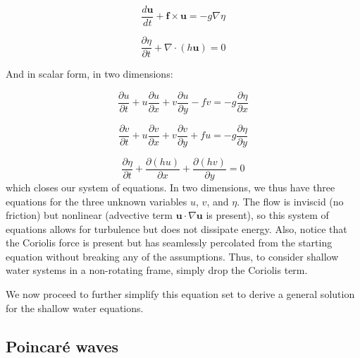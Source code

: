 \documentclass[12pt]{article}
\numberwithin{equation}{section}
\numberwithin{figure}{section}
\numberwithin{table}{section}
\begin{document}
\begin{equation}
  \frac{d \mathbf{u}}{dt} + \mathbf{f} \times \mathbf{u} =
  - g \nabla \eta
  \label{eq:shallow_water_final_momentum}
\end{equation}

\begin{equation}
  \frac{\partial \eta}{\partial t} + \nabla \cdot (h \mathbf{u}) = 0
  \label{eq:shallow_water_final_continuity}
\end{equation}

And in scalar form, in two dimensions:

\begin{equation}
  \frac{\partial u}{\partial t} +
  u \frac{\partial u}{\partial x} +
  v \frac{\partial u}{\partial y} -
  f v = 
  -g \frac{\partial \eta}{\partial x}
  \label{eq:shallow_water_final_scalar_u}
\end{equation}

\begin{equation}
  \frac{\partial v}{\partial t} +
  u \frac{\partial v}{\partial x} +
  v \frac{\partial v}{\partial y} +
  f u =
  -g \frac{\partial \eta}{\partial y}
  \label{eq:shallow_water_final_scalar_v}
\end{equation}

\begin{equation}
  \frac{\partial \eta}{\partial t} +
  \frac{\partial (hu)}{\partial x} +
  \frac{\partial (hv)}{\partial y} = 0
  \label{eq:shallow_water_final_scalar_eta}
\end{equation}
which closes our system of equations.
In two dimensions, we thus have three equations for the three unknown
variables $u$, $v$, and $\eta$.
The flow is inviscid (no friction) but nonlinear (advective term
$\mathbf{u} \cdot \nabla \mathbf{u}$ is present), so this system of equations
allows for turbulence but does not dissipate energy.
Also, notice that the Coriolis force is present but has seamlessly percolated
from the starting equation without breaking any of the assumptions.
Thus, to consider shallow water systems in a non-rotating frame, simply drop
the Coriolis term.

We now proceed to further simplify this equation set to derive a general
solution for the shallow water equations.

\subsection{Poincaré waves}
\label{sec:poincare_waves}
\end{document}

